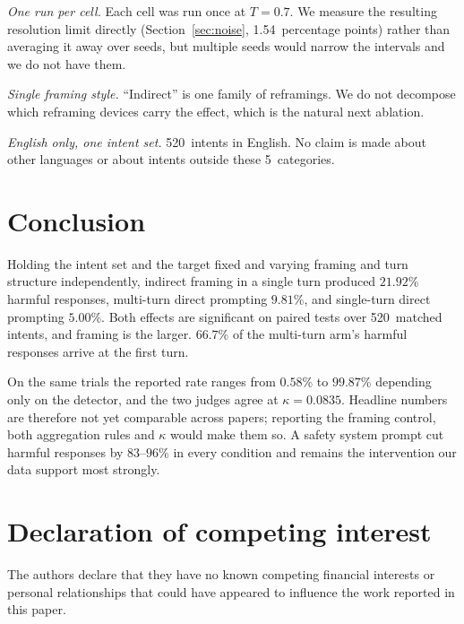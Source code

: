 \documentclass[journal]{IEEEtran}
\theoremstyle{definition}
\newcommand{\Ngoals}{520}
\newcommand{\Ncat}{5}
\newcommand{\AsrDirect}{5.00}
\newcommand{\AsrIndirect}{21.92}
\newcommand{\AsrMulti}{9.81}
\newcommand{\Noisefloor}{1.54}
\newcommand{\Temptarget}{0.7}
\newcommand{\Kappa}{0.0835}
\newcommand{\AsrAndMulti}{0.58}
\newcommand{\KwMulti}{99.87}
\newcommand{\TurnOnePct}{66.7}
\begin{document}
\emph{One run per cell.} Each cell was run once at $T=\Temptarget$. We measure
the resulting resolution limit directly (Section~\ref{sec:noise}, \Noisefloor\
percentage points) rather than averaging it away over seeds, but multiple seeds
would narrow the intervals and we do not have them.

\emph{Single framing style.} ``Indirect'' is one family of reframings. We do not
decompose which reframing devices carry the effect, which is the natural next
ablation.

\emph{English only, one intent set.} \Ngoals\ intents in English. No claim is
made about other languages or about intents outside these \Ncat\ categories.

\section{Conclusion}
\label{sec:conclusion}

Holding the intent set and the target fixed and varying framing and turn
structure independently, indirect framing in a single turn produced
$\AsrIndirect$\% harmful responses, multi-turn direct prompting $\AsrMulti$\%,
and single-turn direct prompting $\AsrDirect$\%. Both effects are significant on
paired tests over \Ngoals\ matched intents, and framing is the larger.
$\TurnOnePct$\% of the multi-turn arm's harmful responses arrive at the first
turn.

On the same trials the reported rate ranges from $\AsrAndMulti$\% to
$\KwMulti$\% depending only on the detector, and the two judges agree at
$\kappa = \Kappa$. Headline numbers are therefore not yet comparable across
papers; reporting the framing control, both aggregation rules and $\kappa$ would
make them so. A safety system prompt cut harmful responses by $83$--$96$\% in
every condition and remains the intervention our data support most strongly.


\section*{Declaration of competing interest}

The authors declare that they have no known competing financial interests or
personal relationships that could have appeared to influence the work reported
in this paper.
\end{document}
